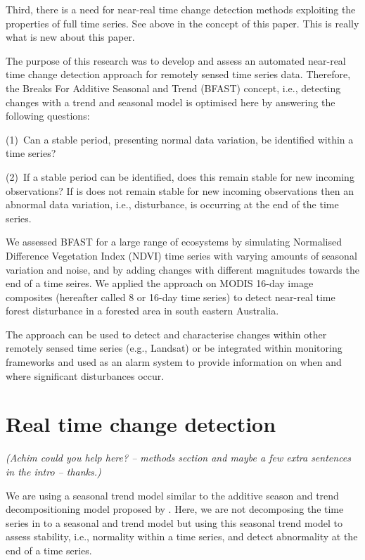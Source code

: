 \documentclass[authoryear,preprint,review,10pt]{elsarticle}
\newcommand{\fixme}[1]{\emph{\marginpar{FIXME} (#1)}}
\begin{document}
Third, there is a need for near-real time change detection methods exploiting
the properties of full time series. See above in the concept of this paper. This
is really what is new about this paper.

The purpose of this research was to develop and assess an automated near-real
time change detection approach for remotely sensed time series data.  Therefore,
the Breaks For Additive Seasonal and Trend (BFAST\@) concept, i.e., detecting
changes with a trend and seasonal model is optimised here by answering the
following questions:

(1)~Can a stable period, presenting normal data variation, be identified within
a time series?


(2)~If a stable period can be identified, does this remain stable for new
incoming observations? If is does not remain stable for new incoming
observations then an abnormal data variation, i.e., disturbance, is occurring at
the end of the time series. 

We assessed BFAST for a large range of ecosystems by simulating Normalised
Difference Vegetation Index (NDVI) time series with varying amounts of seasonal
variation and noise, and by adding changes with different magnitudes towards the
end of a time seires. We applied the approach on MODIS 16-day image composites
(hereafter called 8 or 16-day time series) to detect near-real time forest
disturbance in a forested area in south eastern Australia. 

The approach can be used to detect and characterise changes within other
remotely sensed time series (e.g., Landsat) or be integrated within monitoring
frameworks and used as an alarm system to provide information on when and where
significant disturbances occur.

\section{Real time change detection}\label{sec:Method}

\fixme{Achim could you help here? -- methods section and maybe a few extra
sentences in the intro -- thanks.}

We are using a seasonal trend model similar to the additive season and trend
decompositioning model proposed by \citet{Verbesselt:2010wo}. Here, we are not
decomposing the time series in to a seasonal and trend model but using this
seasonal trend model to assess stability, i.e., normality within a time series,
and detect abnormality at the end of a time series.
\end{document}
